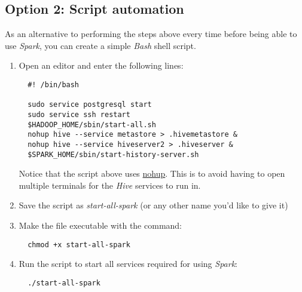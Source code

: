 \documentclass{article}
\begin{document}
  \subsection{Option 2: Script automation}
  As an alternative to performing the steps above every time before being able to use \emph{Spark},
  you can create a simple \emph{Bash} shell script.
  \begin{enumerate}
  \item Open an editor and enter the following lines:
  \begin{verbatim}
  #! /bin/bash

  sudo service postgresql start
  sudo service ssh restart
  $HADOOP_HOME/sbin/start-all.sh
  nohup hive --service metastore > .hivemetastore &
  nohup hive --service hiveserver2 > .hiveserver &
  $SPARK_HOME/sbin/start-history-server.sh
  \end{verbatim}
  Notice that the script above uses \href{https://en.wikipedia.org/wiki/Nohup}{nohup}. This is to
  avoid having to open multiple terminals for the \emph{Hive} services to run in.
  
  \item Save the script as \emph{start-all-spark} (or any other name you'd like to give it)

  \item Make the file executable with the command:
  \begin{verbatim}
  chmod +x start-all-spark
  \end{verbatim}

  \item Run the script to start all services required for using \emph{Spark}:
  \begin{verbatim}
  ./start-all-spark
  \end{verbatim}
\end{enumerate}
\end{document}
